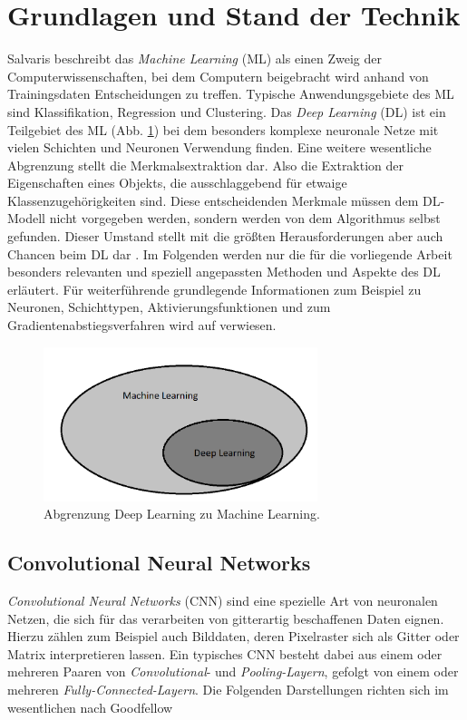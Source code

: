 \section{Grundlagen und Stand der Technik}

Salvaris beschreibt das \textit{Machine Learning} (ML) als einen Zweig der Computerwissenschaften, bei dem Computern beigebracht wird anhand von Trainingsdaten Entscheidungen zu treffen. Typische Anwendungsgebiete des ML sind Klassifikation, Regression und Clustering. Das \textit{Deep Learning} (DL) ist ein Teilgebiet des ML (Abb. \ref{dlmlunterschied}) bei dem besonders komplexe neuronale Netze mit vielen Schichten und Neuronen Verwendung finden. Eine weitere wesentliche Abgrenzung stellt die Merkmalsextraktion dar. Also die Extraktion der Eigenschaften eines Objekts, die ausschlaggebend für etwaige Klassenzugehörigkeiten sind. Diese entscheidenden Merkmale müssen dem DL-Modell nicht vorgegeben werden, sondern werden von dem Algorithmus selbst gefunden. Dieser Umstand stellt mit die größten Herausforderungen aber auch Chancen beim DL dar \cite[S.32-47]{dlazure2019}.  Im Folgenden werden nur die für die vorliegende Arbeit besonders relevanten und speziell angepassten Methoden und Aspekte des DL erläutert. Für weiterführende grundlegende Informationen zum Beispiel zu Neuronen, Schichttypen, Aktivierungsfunktionen und zum Gradientenabstiegsverfahren wird auf \cite{dlbook2018} verwiesen. 
\begin{figure}[!h]
  \centering
  \includegraphics[width=8cm]{mldlunterschied.png}
  \caption{Abgrenzung Deep Learning zu Machine Learning.}
  \label{dlmlunterschied}
\end{figure}

\subsection{Convolutional Neural Networks}

\textit{Convolutional Neural Networks} (CNN) sind eine spezielle Art von neuronalen Netzen, die sich für das verarbeiten von gitterartig beschaffenen Daten eignen. Hierzu zählen zum Beispiel auch Bilddaten, deren Pixelraster sich als Gitter oder Matrix interpretieren lassen. Ein typisches CNN besteht dabei aus einem oder mehreren Paaren von \textit{Convolutional}- und \textit{Pooling-Layern}, gefolgt von einem oder mehreren \textit{Fully-Connected-Layern}. Die Folgenden Darstellungen richten sich im wesentlichen nach Goodfellow \cite[S.326-366]{Goodfellow-et-al-2016}
